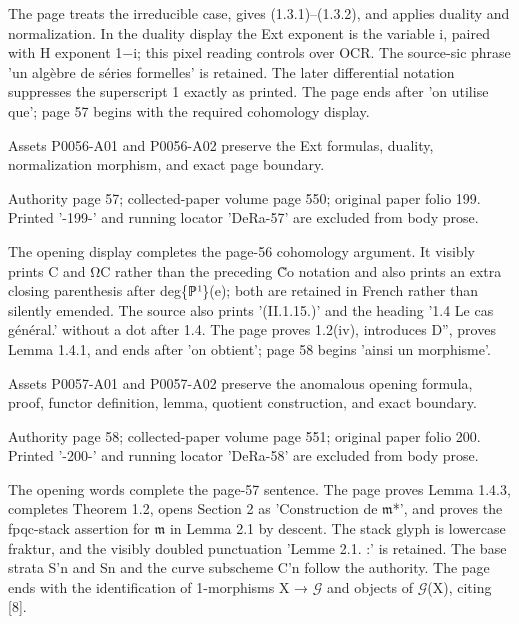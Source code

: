 \documentclass[11pt,a4paper]{article}
\begin{document}
The page treats the irreducible case, gives (1.3.1)--(1.3.2), and applies duality and normalization. In the duality display the Ext exponent is the variable i, paired with H exponent 1−i; this pixel reading controls over OCR. The source-sic phrase 'un algèbre de séries formelles' is retained. The later differential notation suppresses the superscript 1 exactly as printed. The page ends after 'on utilise que'; page 57 begins with the required cohomology display.

Assets P0056-A01 and P0056-A02 preserve the Ext formulas, duality, normalization morphism, and exact page boundary.


\par\medskip
\hypertarget{D018-P0057}{}
\par\smallskip
Authority page 57; collected-paper volume page 550; original paper folio 199. Printed '-199-' and running locator 'DeRa-57' are excluded from body prose.

The opening display completes the page-56 cohomology argument. It visibly prints C and Ω\textunderscore{}C rather than the preceding C̃\textunderscore{}o notation and also prints an extra closing parenthesis after deg\textunderscore{}\{ℙ¹\}(e); both are retained in French rather than silently emended. The source also prints '(II.1.15.)' and the heading '1.4 Le cas général.' without a dot after 1.4. The page proves 1.2(iv), introduces D'', proves Lemma 1.4.1, and ends after 'on obtient'; page 58 begins 'ainsi un morphisme'.

Assets P0057-A01 and P0057-A02 preserve the anomalous opening formula, proof, functor definition, lemma, quotient construction, and exact boundary.


\par\medskip
\hypertarget{D018-P0058}{}
\par\smallskip
Authority page 58; collected-paper volume page 551; original paper folio 200. Printed '-200-' and running locator 'DeRa-58' are excluded from body prose.

The opening words complete the page-57 sentence. The page proves Lemma 1.4.3, completes Theorem 1.2, opens Section 2 as 'Construction de \ensuremath{\mathfrak{m}}\textunderscore{}*', and proves the fpqc-stack assertion for \ensuremath{\mathfrak{m}} in Lemma 2.1 by descent. The stack glyph is lowercase fraktur, and the visibly doubled punctuation 'Lemme 2.1. :' is retained. The base strata S'\textunderscore{}n and S\textunderscore{}n and the curve subscheme C'\textunderscore{}n follow the authority. The page ends with the identification of 1-morphisms X → \ensuremath{\mathcal{G}} and objects of \ensuremath{\mathcal{G}}(X), citing [8].
\end{document}
